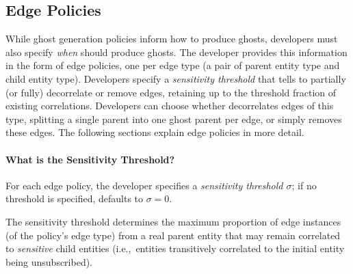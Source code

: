 %

\subsection{Edge Policies}
While ghost generation policies inform \sys how to produce ghosts, developers must also specify
\emph{when} \sys should produce ghosts. 
The developer provides \sys this information in the form of edge policies, one per edge type (a pair of parent
entity type and child entity type). 
Developers specify a
\emph{sensitivity threshold} that tells \sys to partially (or fully) decorrelate or remove edges,
retaining up to the threshold fraction of existing correlations.
Developers can choose whether \sys decorrelates edges of this type, splitting a single parent
into one ghost parent per edge, or simply removes these edges. 
The following sections explain edge policies in more detail.


\paragraph{What is the Sensitivity Threshold?}
For each edge policy, the developer specifies a \emph{sensitivity
threshold $\sigma$}; if no threshold is specified, \sys defaults to $\sigma=0$. 

The sensitivity threshold determines the maximum proportion of edge instances (of the policy's edge
type) from a real parent entity that may remain correlated to \emph{sensitive} child entities (i.e.,\
entities transitively correlated to the initial entity being unsubscribed). 


